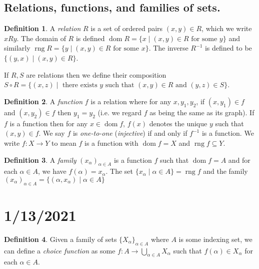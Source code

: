 \documentclass{article}
\DeclareMathOperator{\dom}{dom}
\DeclareMathOperator{\rng}{rng}
\theoremstyle{definition}
\newtheorem*{definition}{Definition}
\begin{document}
\subsection*{Relations, functions, and families of sets.}

\begin{definition}
    A \emph{relation} $R$ is a set of ordered pairs $(x, y) \in R$, which we write $xRy$.
    The domain of $R$ is defined $\dom R = \{x \mid (x, y) \in R \text{ for some } y\}$ and similarly
    $\rng R = \{y \mid (x, y) \in R \text{ for some } x\}$. The inverse $R^{-1}$ is defined to be $\{(y,x) \mid (x, y) \in R\}$.
    
    If $R, S$ are relations then we define their composition $S \circ R = \{(x, z) \mid \text{ there exists } y \text{ such that } (x, y) \in R \text{ and } (y, z) \in S\}$.
\end{definition}

\begin{definition}
    A \emph{function} $f$ is a relation where for any $x, y_1, y_2$, if $(x, y_1) \in f$ and $(x, y_2) \in f$ then $y_1 = y_2$ (i.e. we regard $f$ as being the same as its graph).
    If $f$ is a function then for any $x \in \dom f$, $f(x)$ denotes the unique $y$ such that $(x, y) \in f$.
    We say $f$ is \textit{one-to-one} (\textit{injective}) if and only if $f^{-1}$ is a function.
    We write $f:X \longrightarrow Y$ to mean $f$ is a function with $\dom f = X$ and $\rng f \subseteq Y$.
\end{definition}

\begin{definition}
    A \emph{family} $(x_\alpha)_{\alpha \in A}$ is a function $f$ such that $\dom f = A$ and for each $\alpha \in A$, we have $f(\alpha) = x_\alpha$. The set $\{x_\alpha \mid \alpha \in A\} = \rng f$ and the family $(x_\alpha)_{\alpha \in A} = \{(\alpha, x_\alpha) \mid \alpha \in A\}$
\end{definition}

\section*{1/13/2021}

\begin{definition}
    Given a family of sets $\{X_\alpha\}_{\alpha \in A}$ where $A$ is some indexing set, we can define a \emph{choice function} as some $f: A \rightarrow \bigcup_{\alpha \in A} X_\alpha$ such that $f(\alpha) \in X_\alpha$ for each $\alpha \in A$.
\end{definition}
\end{document}
